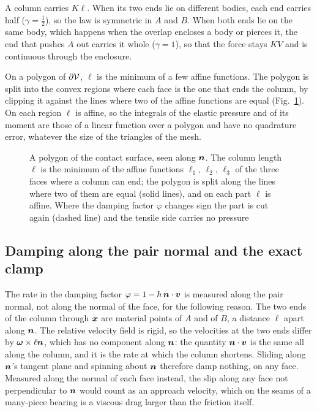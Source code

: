 A column carries $K\ell$. When its two ends lie on different bodies, each end carries half
($\gamma = \tfrac12$), so the law is symmetric in $A$ and $B$. When both ends lie on the same
body, which happens when the overlap encloses a body or pierces it, the end that pushes $A$ out
carries it whole ($\gamma = 1$), so that the force stays $K V$ and is continuous through the
enclosure.

On a polygon of $\partial\mathcal{V}$, $\ell$ is the minimum of a few affine functions. The polygon
is split into the convex regions where each face is the one that ends the column, by clipping
it against the lines where two of the affine functions are equal (Fig.~\ref{fig:partition}). On
each region $\ell$ is affine, so the integrals of the elastic pressure and of its moment are
those of a linear function over a polygon and have no quadrature error, whatever the size of
the triangles of the mesh.

\begin{figure}[!htbp]
\centering

\caption{A polygon of the contact surface, seen along $\boldsymbol{n}$. The column length $\ell$ is the
minimum of the affine functions $\ell_1$, $\ell_2$, $\ell_3$ of the three faces where a column can
end; the polygon is split along the lines where two of them are equal (solid lines), and on each
part $\ell$ is affine. Where the damping factor $\varphi$ changes sign the part is cut again (dashed
line) and the tensile side carries no pressure}
\label{fig:partition}
\end{figure}

\subsection{Damping along the pair normal and the exact clamp}

The rate in the damping factor $\varphi = 1 - h\,\boldsymbol{n}\cdot\boldsymbol{v}$ is measured along the pair normal,
not along the normal of the face, for the following reason. The two ends of the column through
$\boldsymbol{x}$ are material points of $A$ and of $B$, a distance $\ell$ apart along $\boldsymbol{n}$. The relative
velocity field is rigid, so the velocities at the two ends differ by $\boldsymbol{\omega}\times\ell\boldsymbol{n}$, which has
no component along $\boldsymbol{n}$: the quantity $\boldsymbol{n}\cdot\boldsymbol{v}$ is the same all along the column, and it is
the rate at which the column shortens. Sliding along $\boldsymbol{n}$'s tangent plane and spinning about
$\boldsymbol{n}$ therefore damp nothing, on any face. Measured along the normal of each face instead, the
slip along any face not perpendicular to $\boldsymbol{n}$ would count as an approach velocity, which on the
seams of a many-piece bearing is a viscous drag larger than the friction itself.

